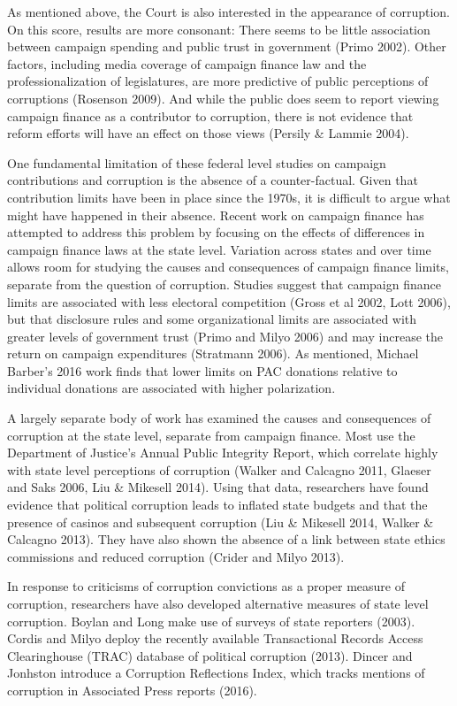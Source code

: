 \documentclass{jopsubmission}
\begin{document}
As mentioned above, the Court is also interested in the appearance of
corruption. On this score, results are more consonant: There seems to be
little association between campaign spending and public trust in
government (Primo 2002). Other factors, including media coverage of
campaign finance law and the professionalization of legislatures, are
more predictive of public perceptions of corruptions (Rosenson 2009).
And while the public does seem to report viewing campaign finance as a
contributor to corruption, there is not evidence that reform efforts
will have an effect on those views (Persily \& Lammie 2004).

One fundamental limitation of these federal level studies on campaign
contributions and corruption is the absence of a counter-factual. Given
that contribution limits have been in place since the 1970s, it is
difficult to argue what might have happened in their absence. Recent
work on campaign finance has attempted to address this problem by
focusing on the effects of differences in campaign finance laws at the
state level. Variation across states and over time allows room for
studying the causes and consequences of campaign finance limits,
separate from the question of corruption. Studies suggest that campaign
finance limits are associated with less electoral competition (Gross et
al 2002, Lott 2006), but that disclosure rules and some organizational
limits are associated with greater levels of government trust (Primo and
Milyo 2006) and may increase the return on campaign expenditures
(Stratmann 2006). As mentioned, Michael Barber's 2016 work finds that
lower limits on PAC donations relative to individual donations are
associated with higher polarization.

A largely separate body of work has examined the causes and consequences
of corruption at the state level, separate from campaign finance. Most
use the Department of Justice's Annual Public Integrity Report, which
correlate highly with state level perceptions of corruption (Walker and
Calcagno 2011, Glaeser and Saks 2006, Liu \& Mikesell 2014). Using that
data, researchers have found evidence that political corruption leads to
inflated state budgets and that the presence of casinos and subsequent
corruption (Liu \& Mikesell 2014, Walker \& Calcagno 2013). They have
also shown the absence of a link between state ethics commissions and
reduced corruption (Crider and Milyo 2013).

In response to criticisms of corruption convictions as a proper measure
of corruption, researchers have also developed alternative measures of
state level corruption. Boylan and Long make use of surveys of state
reporters (2003). Cordis and Milyo deploy the recently available
Transactional Records Access Clearinghouse (TRAC) database of political
corruption (2013). Dincer and Jonhston introduce a Corruption
Reflections Index, which tracks mentions of corruption in Associated
Press reports (2016).
\end{document}

